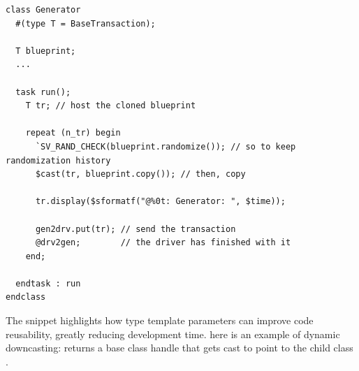 \begin{listing}
\begin{verbatim}
class Generator
  #(type T = BaseTransaction);

  T blueprint;
  ...

  task run();
    T tr; // host the cloned blueprint

    repeat (n_tr) begin
      `SV_RAND_CHECK(blueprint.randomize()); // so to keep randomization history
      $cast(tr, blueprint.copy()); // then, copy

      tr.display($sformatf("@%0t: Generator: ", $time));

      gen2drv.put(tr); // send the transaction
      @drv2gen;        // the driver has finished with it
    end;

  endtask : run
endclass
\end{verbatim}
\caption{The snippet highlights how type template parameters can improve code reusability, greatly reducing development time.  here is an example of dynamic downcasting:  returns a base class handle that gets cast to point to the child class .}
\label{list:gen}
\end{listing}

